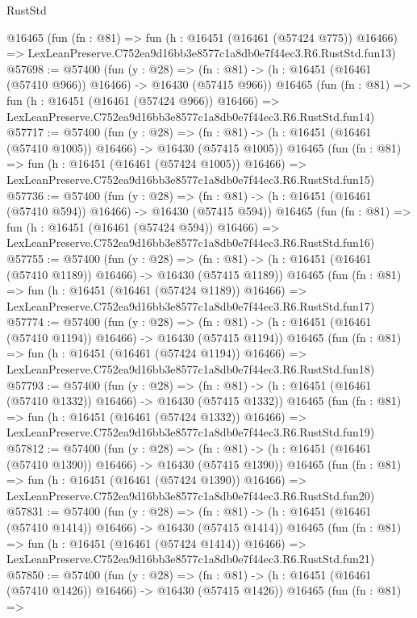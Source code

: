 \begin{lexlean}{RustStd}
\begin{coremodule}
    @16465
    (fun (fn : @81) =>
    fun (h : @16451 (@16461 (@57424 @775)) @16466) =>
    LexLeanPreserve.C752ea9d16bb3e8577c1a8db0e7f44ec3.R6.RustStd.fun13)
@57698 := @57400
    (fun (y : @28) =>
    (fn : @81) -> (h : @16451 (@16461 (@57410 @966)) @16466) -> @16430 (@57415 @966))
    @16465
    (fun (fn : @81) =>
    fun (h : @16451 (@16461 (@57424 @966)) @16466) =>
    LexLeanPreserve.C752ea9d16bb3e8577c1a8db0e7f44ec3.R6.RustStd.fun14)
@57717 := @57400
    (fun (y : @28) =>
    (fn : @81) -> (h : @16451 (@16461 (@57410 @1005)) @16466) -> @16430 (@57415 @1005))
    @16465
    (fun (fn : @81) =>
    fun (h : @16451 (@16461 (@57424 @1005)) @16466) =>
    LexLeanPreserve.C752ea9d16bb3e8577c1a8db0e7f44ec3.R6.RustStd.fun15)
@57736 := @57400
    (fun (y : @28) =>
    (fn : @81) -> (h : @16451 (@16461 (@57410 @594)) @16466) -> @16430 (@57415 @594))
    @16465
    (fun (fn : @81) =>
    fun (h : @16451 (@16461 (@57424 @594)) @16466) =>
    LexLeanPreserve.C752ea9d16bb3e8577c1a8db0e7f44ec3.R6.RustStd.fun16)
@57755 := @57400
    (fun (y : @28) =>
    (fn : @81) -> (h : @16451 (@16461 (@57410 @1189)) @16466) -> @16430 (@57415 @1189))
    @16465
    (fun (fn : @81) =>
    fun (h : @16451 (@16461 (@57424 @1189)) @16466) =>
    LexLeanPreserve.C752ea9d16bb3e8577c1a8db0e7f44ec3.R6.RustStd.fun17)
@57774 := @57400
    (fun (y : @28) =>
    (fn : @81) -> (h : @16451 (@16461 (@57410 @1194)) @16466) -> @16430 (@57415 @1194))
    @16465
    (fun (fn : @81) =>
    fun (h : @16451 (@16461 (@57424 @1194)) @16466) =>
    LexLeanPreserve.C752ea9d16bb3e8577c1a8db0e7f44ec3.R6.RustStd.fun18)
@57793 := @57400
    (fun (y : @28) =>
    (fn : @81) -> (h : @16451 (@16461 (@57410 @1332)) @16466) -> @16430 (@57415 @1332))
    @16465
    (fun (fn : @81) =>
    fun (h : @16451 (@16461 (@57424 @1332)) @16466) =>
    LexLeanPreserve.C752ea9d16bb3e8577c1a8db0e7f44ec3.R6.RustStd.fun19)
@57812 := @57400
    (fun (y : @28) =>
    (fn : @81) -> (h : @16451 (@16461 (@57410 @1390)) @16466) -> @16430 (@57415 @1390))
    @16465
    (fun (fn : @81) =>
    fun (h : @16451 (@16461 (@57424 @1390)) @16466) =>
    LexLeanPreserve.C752ea9d16bb3e8577c1a8db0e7f44ec3.R6.RustStd.fun20)
@57831 := @57400
    (fun (y : @28) =>
    (fn : @81) -> (h : @16451 (@16461 (@57410 @1414)) @16466) -> @16430 (@57415 @1414))
    @16465
    (fun (fn : @81) =>
    fun (h : @16451 (@16461 (@57424 @1414)) @16466) =>
    LexLeanPreserve.C752ea9d16bb3e8577c1a8db0e7f44ec3.R6.RustStd.fun21)
@57850 := @57400
    (fun (y : @28) =>
    (fn : @81) -> (h : @16451 (@16461 (@57410 @1426)) @16466) -> @16430 (@57415 @1426))
    @16465
    (fun (fn : @81) =>

\end{coremodule}
\end{lexlean}
